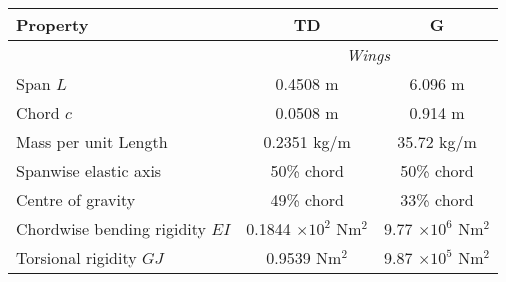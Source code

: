 \documentclass{standalone}
\begin{document}
    \centering
    \begin{tabular}{l c c}
    \toprule
    \toprule
    Property&TD&G\\
    \midrule
    &\multicolumn{2}{c}{\textit{Wings}}\\
    Span $L$     & 0.4508 m & 6.096 m \\
    Chord $c$   & 0.0508 m & 0.914 m \\
    Mass per unit Length     & 0.2351 kg/m & 35.72 kg/m\\
    Spanwise elastic axis   & 50\% chord & 50\% chord\\
    Centre of gravity   & 49\% chord & 33\% chord\\
    Chordwise bending rigidity $EI$  & 0.1844 $\times 10^2$ Nm$^2$ & 9.77 $\times 10^6$ Nm$^2$\\
    Torsional rigidity $GJ$ & 0.9539 Nm$^2$& 9.87 $\times 10^5$ Nm$^2$ \\
    \bottomrule
    \bottomrule
    \end{tabular}
    
\end{document}
